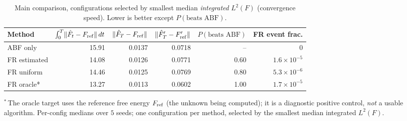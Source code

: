 \begin{table}[t]
\centering
\small
\caption{Main comparison, configurations selected by smallest median \emph{integrated} $L^2(F)$ (convergence speed). Lower is better except $P(\text{beats ABF})$.}
\label{tab:main_integrated}
\begin{tabular}{lrrrrr}
\toprule
Method & $\int_0^T\!\|\hat F_t-F_{\rm ref}\|\,dt$ & $\|\hat F_T-F_{\rm ref}\|$ & $\|\hat F'_T-F'_{\rm ref}\|$ & $P(\text{beats ABF})$ & FR event frac. \\
\midrule
ABF only & 15.91 & 0.0137 & 0.0718 & -- & $0$ \\
FR estimated & 14.08 & 0.0126 & 0.0771 & 0.60 & $1.6\times10^{-5}$ \\
FR uniform & 14.46 & 0.0125 & 0.0769 & 0.80 & $5.3\times10^{-6}$ \\
FR oracle* & 13.27 & 0.0113 & 0.0602 & 1.00 & $1.7\times10^{-5}$ \\
\bottomrule
\end{tabular}
\par\smallskip\footnotesize $^{*}$\,The oracle target uses the reference free energy $F_{\rm ref}$ (the unknown being computed); it is a diagnostic positive control, \emph{not} a usable algorithm. Per-config medians over $5$ seeds; one configuration per method, selected by the smallest median integrated $L^2(F)$.
\end{table}

